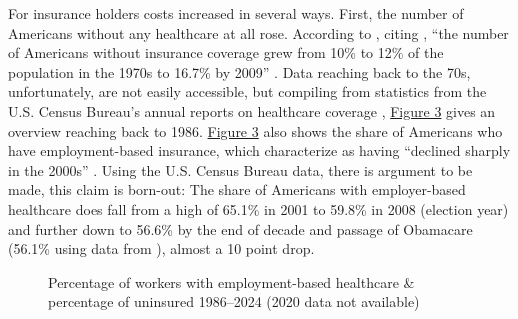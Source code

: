 \documentclass[11pt]{article}
\begin{document}
\noindent For insurance holders costs increased in several ways. First, the number of Americans without any healthcare at all rose. According to \textcite[][]{Jacobs2014}, citing \textcite[][]{Starr2011}, \enquote{the number of Americans without insurance coverage grew from 10\% to 12\% of the population in the 1970s to 16.7\% by 2009} \parencite[p. 451-452]{Jacobs2014}. Data reaching back to the 70s, unfortunately, are not easily accessible, but compiling from statistics from the U.S. Census Bureau's annual reports on healthcare coverage \parencites{Census2013}[see the supplemental matieral of][note that the methdology of these studies has been slightly adjusted over-time somewhat limiting comparability between the two study periods]{Census2024}, \hyperref[fig:emp_un]{Figure 3} gives an overview reaching back to 1986. \hyperref[fig:emp_un]{Figure 3} also shows the share of Americans who have employment-based insurance, which \textcite[][]{Jacobs2014} characterize as having \enquote{declined sharply in the 2000s} . Using the U.S. Census Bureau data, there is argument to be made, this claim is born-out: The share of Americans with employer-based healthcare does fall from a high of 65.1\% in 2001 to 59.8\% in 2008 (election year) and further down to 56.6\% by the end of decade and passage of Obamacare (56.1\% using data from ), almost a 10 point drop.

\begin{figure}[H]
  \sffamily
  \caption{Percentage of workers with employment-based healthcare \& percentage of uninsured 1986--2024 (2020 data not available)}
  
  \label{fig:emp_un}
\end{figure}
\end{document}

